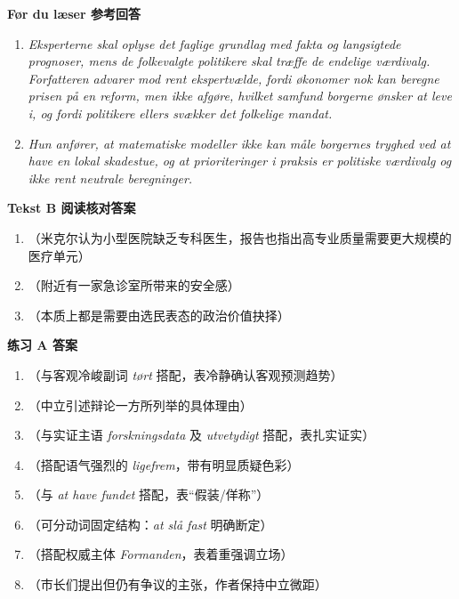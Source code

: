 \begin{answerbox}
\textbf{Før du læser 参考回答}
\begin{enumerate}
  \item \textit{Eksperterne skal oplyse det faglige grundlag med fakta og langsigtede prognoser, mens de folkevalgte politikere skal træffe de endelige værdivalg. Forfatteren advarer mod rent ekspertvælde, fordi økonomer nok kan beregne prisen på en reform, men ikke afgøre, hvilket samfund borgerne ønsker at leve i, og fordi politikere ellers svækker det folkelige mandat.}
  \item \textit{Hun anfører, at matematiske modeller ikke kan måle borgernes tryghed ved at have en lokal skadestue, og at prioriteringer i praksis er politiske værdivalg og ikke rent neutrale beregninger.}
\end{enumerate}

\textbf{Tekst B 阅读核对答案}
\begin{enumerate}
  \item {}（米克尔认为小型医院缺乏专科医生，报告也指出高专业质量需要更大规模的医疗单元）
  \item {}（附近有一家急诊室所带来的安全感）
  \item {}（本质上都是需要由选民表态的政治价值抉择）
\end{enumerate}

\textbf{练习 A 答案}
\begin{enumerate}
  \item {}（与客观冷峻副词 \textit{tørt} 搭配，表冷静确认客观预测趋势）
  \item {}（中立引述辩论一方所列举的具体理由）
  \item {}（与实证主语 \textit{forskningsdata} 及 \textit{utvetydigt} 搭配，表扎实证实）
  \item {}（搭配语气强烈的 \textit{ligefrem}，带有明显质疑色彩）
  \item {}（与 \textit{at have fundet} 搭配，表“假装/佯称”）
  \item {}（可分动词固定结构：\textit{at slå fast} 明确断定）
  \item {}（搭配权威主体 \textit{Formanden}，表着重强调立场）
  \item {}（市长们提出但仍有争议的主张，作者保持中立微距）
\end{enumerate}


\end{answerbox}
